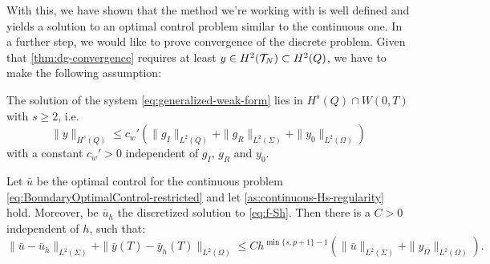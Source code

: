 \documentclass[../thesis.tex]{subfiles}
\begin{document}
With this, we have shown that the method we're working with is well defined and yields a solution to an optimal control problem similar to the continuous one.
In a further step, we would like to prove convergence of the discrete problem.
Given that \cref{thm:dg-convergence} requires at least $y \in H^2(\mathcal{T}_N) \subset H^2(Q)$, we have to make the following assumption:
\begin{assumption}
\label{as:continuous-Hs-regularity}
The solution of the system \cref{eq:generalized-weak-form} lies in $H^s(Q) \cap W(0,T)$ with $s \geq 2$, i.e.
\[
	\| y \|_{H^s(Q)} \leq c_w' \left( \| g_I \|_{L^2(Q)} + \| g_R \|_{L^2(\Sigma)} + \| y_0 \|_{L^2(\Omega)} \right)
\]
with a constant $c_w' > 0$ independent of $g_I$, $g_R$ and $y_0$.
\end{assumption}
\begin{theorem}
Let $\bar{u}$ be the optimal control for the continuous problem \cref{eq:BoundaryOptimalControl-restricted} and let \cref{as:continuous-Hs-regularity} hold. Moreover, be $\bar{u}_h$ the discretized solution to \cref{eq:f-Sh}.
Then there is a $C > 0$ independent of $h$, such that:
\[
	\| \bar{u} - \bar{u}_h \|_{L^2(\Sigma)} + \| \bar{y}(T) - \bar{y}_h(T) \|_{L^2(\Omega)} \leq C h^{\min \{ s, p+1\} - 1} \left( \| \bar{u} \|_{L^2(\Sigma)} + \| y_\Omega \|_{L^2(\Omega)} \right).
\]
\end{theorem}
\end{document}
